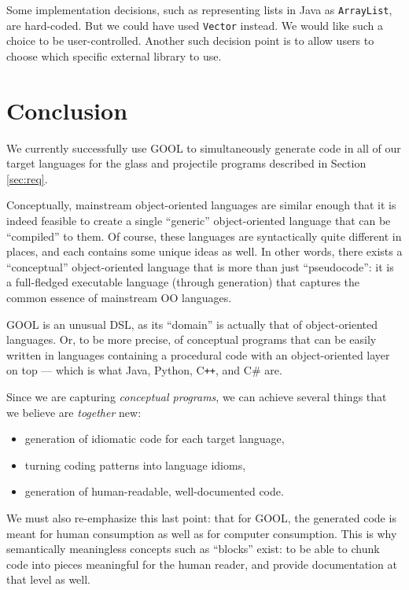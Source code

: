 \documentclass[sigplan,screen,10pt]{acmart}
\newcommand{\Csharp}{C\#}
\newcommand{\Cplusplus}{C\texttt{++}}
\begin{document}
Some implementation decisions, such as representing lists in Java as 
\verb|ArrayList|, are hard-coded. But we could have used \verb|Vector| instead.
We would like such a choice to be user-controlled. Another such decision
point is to allow users to choose which specific external library to use.

\section{Conclusion} \label{sec:conclusions}

We currently successfully use GOOL to simultaneously generate code in all of 
our target languages for the glass and projectile programs described in Section 
\ref{sec:req}. 

Conceptually, mainstream object-oriented languages are similar enough that it
is indeed feasible to create a single ``generic'' object-oriented language that
can be ``compiled'' to them.  Of course, these languages are syntactically
quite different in places, and each contains some unique ideas as well.
In other words, there exists a ``conceptual'' object-oriented language that
is more than just ``pseudocode'': it is a full-fledged executable language
(through generation) that captures the common essence of mainstream OO
languages.

GOOL is an unusual DSL, as its ``domain'' is actually that of object-oriented
languages. Or, to be more precise, of conceptual programs that can be
easily written in languages containing a procedural code with an
object-oriented layer on top --- which is what Java, Python, \Cplusplus{}, and
\Csharp{} are.

Since we are capturing \emph{conceptual programs}, we can achieve
several things that we believe are \emph{together} new:
\begin{itemize}
\item generation of idiomatic code for each target language,
\item turning coding patterns into language idioms,
\item generation of human-readable, well-documented code.
\end{itemize}

We must also re-emphasize this last point: that for GOOL, the generated code
is meant for human consumption as well as for computer consumption. This is
why semantically meaningless concepts such as ``blocks'' exist: to be able
to chunk code into pieces meaningful for the human reader, and provide
documentation at that level as well.
\end{document}
